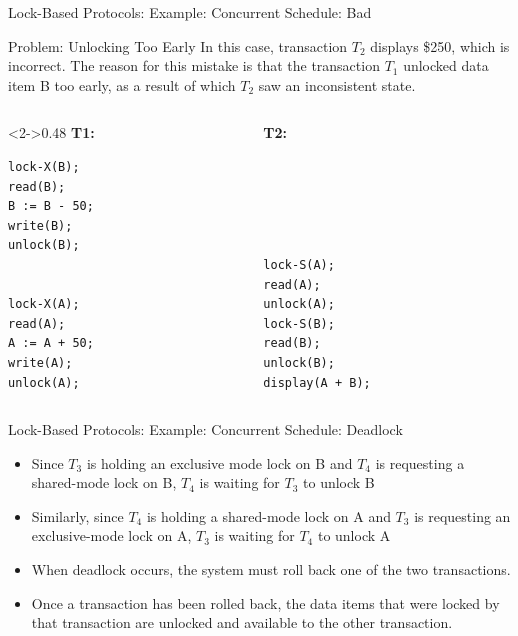 \documentclass[aspectratio=169, xcolor=dvipsnames]{beamer}
\begin{document}
\begin{frame}[fragile]{Lock-Based Protocols: Example: Concurrent Schedule: Bad}
    \begin{alertblock}{Problem: Unlocking Too Early}
        In this case, transaction $T_2$ displays \$250, which is incorrect. The reason for this mistake is that the transaction $T_1$ unlocked data item B too early, as a result of which $T_2$ saw an inconsistent state.
    \end{alertblock}
        \begin{columns}[T]
            \begin{column}<2->{0.48\textwidth}
                \textbf{T1:}
                \begin{lstlisting}
lock-X(B);
read(B); 
B := B - 50; 
write(B); 
unlock(B);


lock-X(A); 
read(A); 
A := A + 50; 
write(A); 
unlock(A);
                \end{lstlisting}
            \end{column}
            \begin{column}{0.48\textwidth}
                \textbf{T2:}
                \begin{lstlisting}





lock-S(A); 
read(A); 
unlock(A); 
lock-S(B); 
read(B); 
unlock(B); 
display(A + B);
                \end{lstlisting}
            \end{column}
        \end{columns}
\end{frame}

\begin{frame}{Lock-Based Protocols: Example: Concurrent Schedule: Deadlock}
    \begin{itemize}[<+->]
        \item Since $T_3$ is holding an exclusive mode lock on B and $T_4$ is requesting a shared-mode lock on B, $T_4$ is waiting for $T_3$ to unlock B
        \item Similarly, since $T_4$ is holding a shared-mode lock on A and $T_3$ is requesting an exclusive-mode lock on A, $T_3$ is waiting for $T_4$ to unlock A
    \end{itemize}
    \begin{itemize}[<+->]
        \item When deadlock occurs, the system must roll back one of the two transactions.
        \item Once a transaction has been rolled back, the data items that were locked by that transaction are unlocked and available to the other transaction.
    \end{itemize}
\end{frame}
\end{document}
